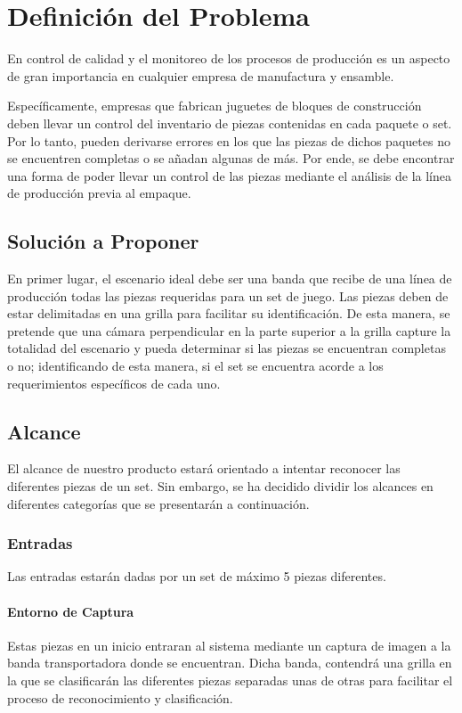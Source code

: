 \documentclass[letterpaper]{scrreprt}
\begin{document}
\chapter{Definición del Problema} 
En control de calidad y el monitoreo de los procesos de producción es un aspecto de gran importancia en cualquier empresa de manufactura y ensamble.

Específicamente, empresas que fabrican juguetes de bloques de construcción deben llevar un control del inventario de piezas contenidas en cada paquete o set. Por lo tanto, pueden derivarse errores en los que las piezas de dichos paquetes no se encuentren completas o se añadan algunas de más.  Por ende, se debe encontrar una forma de poder llevar un control de las piezas mediante el análisis de la línea de producción previa al empaque. 

\section{Solución a Proponer}

En primer lugar, el escenario ideal debe ser una banda que recibe de una línea de producción todas las piezas requeridas para un set de juego. Las piezas deben de estar delimitadas en una grilla para facilitar su identificación. De esta manera, se pretende que una cámara perpendicular en la parte superior a la grilla capture la totalidad del escenario y pueda determinar si las piezas se encuentran completas o no; identificando de esta manera, si el set se encuentra acorde a los requerimientos específicos de cada uno.

\section{Alcance}
El alcance de nuestro producto estará orientado a intentar reconocer las diferentes piezas de un set. Sin embargo, se ha decidido dividir los alcances en diferentes categorías que se presentarán a continuación.

\subsection{Entradas}
Las entradas estarán dadas por un set de máximo 5 piezas diferentes. 
\subsubsection{Entorno de Captura}
Estas piezas en un inicio entraran al sistema mediante un captura de imagen a la banda transportadora donde se encuentran. Dicha banda, contendrá una grilla en la que se clasificarán las diferentes piezas separadas unas de otras para facilitar el proceso de reconocimiento y clasificación.
\end{document}

